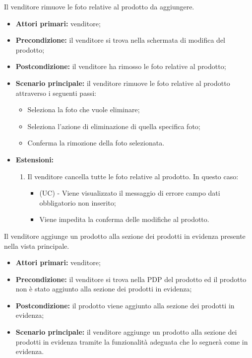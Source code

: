 Il venditore rimuove le foto relative al prodotto da aggiungere.
\begin{itemize}
    \item \textbf{Attori primari:} venditore;
    \item \textbf{Precondizione:} il venditore si trova nella schermata di modifica del prodotto;
    \item \textbf{Postcondizione:} il venditore ha rimosso le foto relative al prodotto;
    \item \textbf{Scenario principale:} il venditore rimuove le foto relative al prodotto attraverso i seguenti passi: %
    \begin{itemize}
        \item Seleziona la foto che vuole eliminare;
        \item Seleziona l'azione di eliminazione di quella specifica foto;
        \item Conferma la rimozione della foto selezionata.
    \end{itemize}
    \item \textbf{Estensioni:}
    \begin{enumerate}[label=\lett]
    	\item Il venditore cancella tutte le foto relative al prodotto. In questo caso:
    	\begin{itemize}
    		\item (UC) - Viene visualizzato il messaggio di errore campo dati obbligatorio non inserito;
    		\item Viene impedita la conferma delle modifiche al prodotto.
    	\end{itemize}
    \end{enumerate}
\end{itemize}

Il venditore aggiunge un prodotto alla sezione dei prodotti in evidenza presente nella vista principale.
\begin{itemize}
    \item \textbf{Attori primari:} venditore;
    \item \textbf{Precondizione:} il venditore si trova nella PDP del prodotto ed il prodotto non è stato aggiunto alla sezione dei prodotti in evidenza;
    \item \textbf{Postcondizione:} il prodotto viene aggiunto alla sezione dei prodotti in evidenza;
    \item \textbf{Scenario principale:} il venditore aggiunge un prodotto alla sezione dei prodotti in evidenza tramite la funzionalità adeguata che lo segnerà come in evidenza.
\end{itemize}

